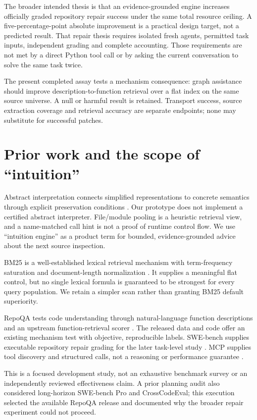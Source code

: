 \documentclass[11pt]{article}
\begin{document}
The broader intended thesis is that an evidence-grounded engine increases officially graded repository repair success under the same total resource ceiling. A five-percentage-point absolute improvement is a practical design target, not a predicted result. That repair thesis requires isolated fresh agents, permitted task inputs, independent grading and complete accounting. Those requirements are not met by a direct Python tool call or by asking the current conversation to solve the same task twice.

The present completed assay tests a mechanism consequence: graph assistance should improve description-to-function retrieval over a flat index on the same source universe. A null or harmful result is retained. Transport success, source extraction coverage and retrieval accuracy are separate endpoints; none may substitute for successful patches.

\section{Prior work and the scope of ``intuition''}
Abstract interpretation connects simplified representations to concrete semantics through explicit preservation conditions \citep{cousot1977}. Our prototype does not implement a certified abstract interpreter. File/module pooling is a heuristic retrieval view, and a name-matched call hint is not a proof of runtime control flow. We use ``intuition engine'' as a product term for bounded, evidence-grounded advice about the next source inspection.

BM25 is a well-established lexical retrieval mechanism with term-frequency saturation and document-length normalization \citep{bm252009}. It supplies a meaningful flat control, but no single lexical formula is guaranteed to be strongest for every query population. We retain a simpler scan rather than granting BM25 default superiority.

RepoQA tests code understanding through natural-language function descriptions and an upstream function-retrieval scorer \citep{repoqa2024,repoqasource}. The released data and code offer an existing mechanism test with objective, reproducible labels. SWE-bench supplies executable repository repair grading for the later task-level study \citep{swebench}. MCP supplies tool discovery and structured calls, not a reasoning or performance guarantee \citep{mcp2025,mcppython}.

This is a focused development study, not an exhaustive benchmark survey or an independently reviewed effectiveness claim. A prior planning audit also considered long-horizon SWE-bench Pro and CrossCodeEval; this execution selected the available RepoQA release and documented why the broader repair experiment could not proceed.
\end{document}
